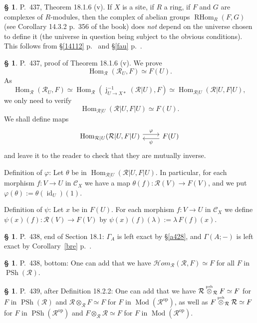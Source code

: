 \documentclass[12pt]{article}%
\theoremstyle{remark}
\theoremstyle{definition}
\newtheorem{s}[thm]{\S}%
\newcommand{\cc}{\mathcal}
\newcommand{\oo}{\operatorname}
\newcommand{\C}{\mathcal C}
\newcommand{\pp}{\varphi}
\newcommand{\HOM}{\cc H\!\mathit{om}}
\DeclareMathOperator{\id}{id}
\DeclareMathOperator{\Hom}{Hom}%
\DeclareMathOperator{\RHom}{RHom}
\DeclareMathOperator{\Mod}{Mod}
\DeclareMathOperator{\op}{op}
\begin{document}
%

\begin{s}
P.~437, Theorem 18.1.6 (v). If $X$ is a site, if $R$ a ring, if $F$ and $G$ are complexes of $R$-modules, then the complex of abelian groups $\RHom_R(F,G)$ (see Corollary 14.3.2 p.~356 of the book) does {\em not} depend on the universe chosen to define it (the universe in question being subject to the obvious conditions). This follows from \S\ref{14112} p.~\pageref{14112} and \S\ref{fau} p.~\pageref{fau}. 
\end{s} 

%

\begin{s} 
P.~437, proof of Theorem 18.1.6 (v). We prove 
$$
\Hom_{\cc R}(\cc R_U,F)\simeq F(U).
$$ 
As 
$$
\Hom_{\cc R}(\cc R_U,F)\simeq\Hom_{\cc R}(\oo j_{U\to X*}^{-1}(\cc R|U),F)\simeq
\Hom_{\cc R|U}(\cc R|U,F|U), 
$$ 
we only need to verify 
$$
\Hom_{\cc R|U}(\cc R|U,F|U)\simeq F(U).
$$ 
We shall define maps 
$$
\begin{tikzcd}
\Hom_{\cc R|U}(\cc R|U,F|U)\ar[yshift=0.7ex]{r}{\pp}&F(U)\ar[yshift=-0.7ex]{l}{\psi}
\end{tikzcd}
$$ 
and leave it to the reader to check that they are mutually inverse. 

Definition of $\pp$: Let $\theta$ be in $\Hom_{\cc R|U}(\cc R|U,F|U)$. In particular, for each morphism $f:V\to U$ in $\C_X$ we have a map $\theta(f):\cc R(V)\to F(V)$, and we put $\pp(\theta):=\theta(\id_U)(1)$. 

Definition of $\psi$: Let $x$ be in $F(U)$. For each morphism $f:V\to U$ in $\C_X$ we define $\psi(x)(f):\cc R(V)\to F(V)$ by $\psi(x)(f)(\lambda):=\lambda\,F(f)(x)$.
\end{s}

%

\begin{s}\label{a438}
P.~438, end of Section 18.1: $\Gamma_A$ is left exact by \S\ref{a428}, and $\Gamma(A;-)$ is left exact by Corollary~\ref{bre} p.~\pageref{bre}.
\end{s} 

% 

\begin{s}\label{homrr}
P.~438, bottom: One can add that we have $\HOM_{\cc R}(\cc R,F)\simeq F$ for all $F$ in $\oo{PSh}(\cc R)$. 
\end{s} 

% 

\begin{s}\label{neutral}
P.~439, after Definition 18.2.2: One can add that we have $\cc R\overset{\text{\tiny psh}}{\otimes}_{\cc R}F\simeq F$ for $F$ in $\oo{PSh}(\cc R)$ and $\cc R\otimes_{\cc R}F\simeq F$ for $F$ in $\Mod(\cc R^{\op})$, as well as $F\overset{\text{\tiny psh}}{\otimes}_{\cc R}\cc R\simeq F$ for $F$ in $\oo{PSh}(\cc R^{\op})$ and $F\otimes_{\cc R}\cc R\simeq F$ for $F$ in $\Mod(\cc R^{\op})$. 
\end{s} 
\end{document}
